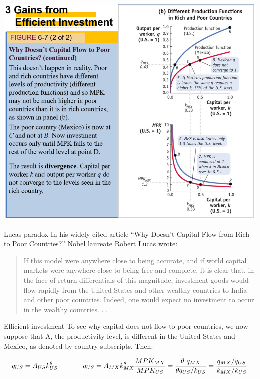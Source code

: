 \documentclass[
  ignorenonframetext,
]{beamer}
\begin{document}
\begin{frame}
\includegraphics{Picture4.png}
\end{frame}

\begin{frame}{Lucas paradox}
\label{lucas-paradox}
In his widely cited article ``Why Doesn't Capital Flow from Rich to Poor
Countries?'' Nobel laureate Robert Lucas wrote:

\begin{quote}
If this model were anywhere close to being accurate, and if world
capital markets were anywhere close to being free and complete, it is
clear that, in the face of return differentials of this magnitude,
investment goods would flow rapidly from the United States and other
wealthy countries to India and other poor countries. Indeed, one would
expect no investment to occur in the wealthy countries. . . .
\end{quote}
\end{frame}

\begin{frame}{Efficient investment}
\label{efficient-investment-7}
To see why capital does not flow to poor countries, we now suppose that
A, the productivity level, is different in the United States and Mexico,
as denoted by country subscripts. Then:

\[
q_{US}=A_{US}k^{\theta}_{US} \ \ \ \ \ \ \ \ \ \ \ q_{US}=A_{MX}k^{\theta}_{MX} \\
\frac{MPK_{MX}}{MPK_{US}}=\frac{\theta \ q_{MX}}{\theta q_{US}/k_{US}}=\frac{q_{MX}/q_{US}}{k_{MX}/k_{US}}
\]
\end{frame}
\end{document}
